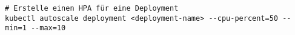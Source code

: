 \begin{verbatim}
# Erstelle einen HPA für eine Deployment
kubectl autoscale deployment <deployment-name> --cpu-percent=50 --min=1 --max=10
\end{verbatim}